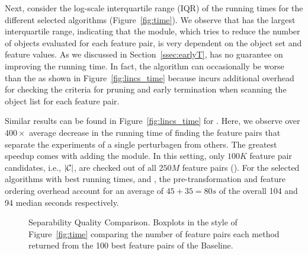Next, consider the log-scale interquartile range (IQR) of the running times for the different selected algorithms (Figure~\ref{fig:time}). We observe that \earlyOrder has the largest interquartile range, indicating that the \earlyT module, which tries to reduce the number of objects evaluated for each feature pair, is very dependent on the object set and feature values. As we discussed in Section~\ref{ssec:earlyT}, \earlyT has no guarantee on improving the running time. In fact, the algorithm can occasionally be worse than the \baseline as shown in Figure~\ref{fig:lincs_time} because \earlyT incurs additional overhead for checking the criteria for pruning and early termination when scanning the object list for each feature pair.

Similar results can be found in Figure~\ref{fig:lincs_time} for \lincs. Here, we observe over $400\times$ average decrease in the running time of finding the \topk feature pairs that separate the \lincs experiments of a single perturbagen from others. The greatest speedup comes with adding the \sampling module. In this setting, only $100K$ feature pair candidates, i.e., $|{\mathcal{C}}|$, are checked out of all $250M$ feature pairs (\timetbl). For the selected algorithms with best running times, \horiz and \vertic, the pre-transformation and feature ordering overhead account for an average of $45+35=80s$ of the overall 104 and 94 median seconds respectively.



\begin{figure}[h]
\centering %
\vspace{-5mm}
\vspace{-5mm}
\caption{Separability Quality Comparison. Boxplots in the style of Figure~\ref{fig:time} comparing the number of feature pairs each method returned from the 100 best feature pairs of the Baseline.}
\vspace{-5mm}
\label{fig:separability}
\end{figure}

